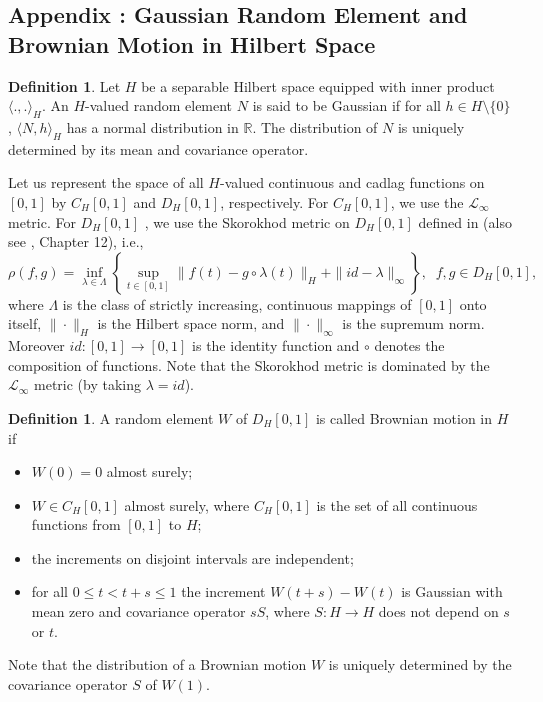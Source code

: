 \documentclass[11pt]{article}
\newcommand{\cL}{\mathcal{L}}
\theoremstyle{plain}
\theoremstyle{definition}
\newtheorem{definition}[theorem]{Definition}
\theoremstyle{remark}
\begin{document}
\begin{appendix}
\section*{Appendix \thesection: Gaussian Random Element and Brownian Motion in Hilbert Space}\label{appna}
\begin{definition}\label{defn:gaussian_hilbert}
    Let $H$ be a separable Hilbert space equipped with inner product $\langle .,.\rangle_H$. An $H$-valued random element $N$ is said to be Gaussian if for all $h\in H\setminus \{0\}$, $\langle N,h\rangle_H$ has a normal distribution in $\mathbb{R}.$ The distribution of $N$ is uniquely determined by its mean and covariance operator.
\end{definition}
Let us represent the space of all $H$-valued continuous and cadlag functions on $[0,1]$ by $C_H[0,1]$ and $D_H[0,1]$, respectively.  For $C_H[0,1]$, we use the $\cL_{\infty}$ metric. For $D_H[0,1]$ , we use the Skorokhod metric on $D_H[0,1]$ defined in \cite{sharipov2016sequential} (also see \cite{billingsley2013convergence}, Chapter 12), i.e.,
$$
\rho(f, g)=\inf _{\lambda \in \Lambda}\left\{\sup _{t \in[0,1]}\|f(t)-g \circ \lambda(t)\|_H+\|i d-\lambda\|_{\infty}\right\},\;\; f, g \in D_H[0,1],
$$
where $\Lambda$ is the class of strictly increasing, continuous mappings of $[0,1]$ onto itself, $\|\cdot\|_H$ is the Hilbert space norm, and $\|\cdot\|_{\infty}$ is the supremum norm. Moreover $i d:[0,1] \rightarrow[0,1]$ is the identity function and $\circ$ denotes the composition of functions. Note that the Skorokhod metric is dominated by the $\cL_{\infty}$ metric (by taking $\lambda=id$).
\begin{definition}\label{defn:brownian_hilbert}
     A random element $W$ of $D_H[0,1]$ is called Brownian motion in $H$ if
     \begin{itemize}
\item[(i)] $W(0)=0$ almost surely;
\item[(ii)] $W \in C_H[0,1]$ almost surely, where $C_H[0,1]$ is the set of all continuous functions from $[0,1]$ to $H$;
\item[(iii)] the increments on disjoint intervals are independent;
\item[(iv)] for all $0 \leq t<t+s \leq 1$ the increment $W(t+s)-W(t)$ is Gaussian with mean zero and covariance operator $s S$, where $S: H \rightarrow H$ does not depend on $s$ or $t$.
\end{itemize}
Note that the distribution of a Brownian motion $W$ is uniquely determined by the covariance operator $S$ of $W(1)$.
\end{definition}


\end{appendix}
\end{document}

